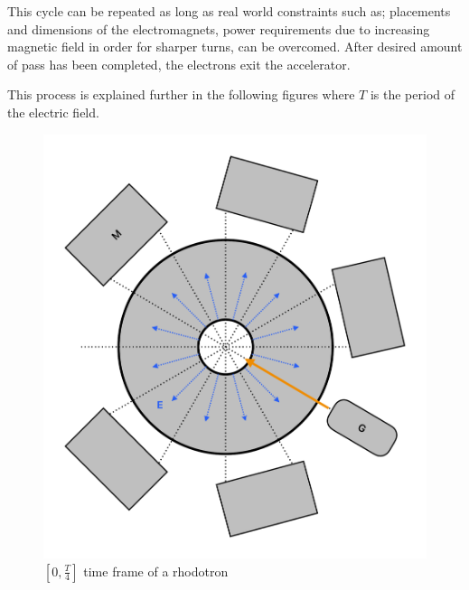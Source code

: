 \documentclass[a4paper,oneside,12pt]{report}
\numberwithin{equation}{chapter}
\begin{document}
This cycle can be repeated as long as real world constraints such as; placements and dimensions of the electromagnets, power requirements due to increasing magnetic field in order for sharper turns, can be overcomed.
After desired amount of pass has been completed, the electrons exit the accelerator.

This process is explained further in the following figures where $T$ is the period of the electric field.
\begin{figure}[H]
    \centering
    \includegraphics[width=\textwidth]{./figures/illustrations/rhod1.pdf}
    \caption{$[0, \frac{T}{4}]$ time frame of a rhodotron}
    \label{fig:rhod_cycle_1}
\end{figure}
\end{document}
